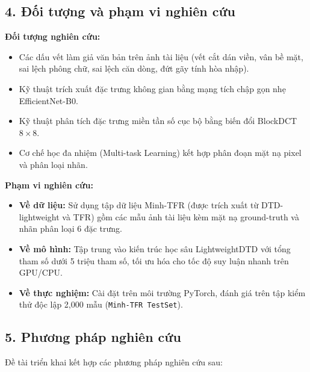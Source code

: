 \subsection{4. Đối tượng và phạm vi nghiên cứu}

\indent\indent \textbf{Đối tượng nghiên cứu:}
\begin{itemize}
    \item Các dấu vết làm giả văn bản trên ảnh tài liệu (vết cắt dán viền, vân bề mặt, sai lệch phông chữ, sai lệch căn dòng, đứt gãy tính hòa nhập).
    \item Kỹ thuật trích xuất đặc trưng không gian bằng mạng tích chập gọn nhẹ EfficientNet-B0.
    \item Kỹ thuật phân tích đặc trưng miền tần số cục bộ bằng biến đổi BlockDCT $8 \times 8$.
    \item Cơ chế học đa nhiệm (Multi-task Learning) kết hợp phân đoạn mặt nạ pixel và phân loại nhãn.
\end{itemize}
\vspace{0.3cm}

\textbf{Phạm vi nghiên cứu:}
\begin{itemize}
    \item \textbf{Về dữ liệu:} Sử dụng tập dữ liệu Minh-TFR (được trích xuất từ DTD-lightweight và TFR) gồm các mẫu ảnh tài liệu kèm mặt nạ ground-truth và nhãn phân loại 6 đặc trưng.
    \item \textbf{Về mô hình:} Tập trung vào kiến trúc học sâu LightweightDTD với tổng tham số dưới 5 triệu tham số, tối ưu hóa cho tốc độ suy luận nhanh trên GPU/CPU.
    \item \textbf{Về thực nghiệm:} Cài đặt trên môi trường PyTorch, đánh giá trên tập kiểm thử độc lập 2,000 mẫu (\texttt{Minh-TFR TestSet}).
\end{itemize}

\subsection{5. Phương pháp nghiên cứu}

\indent\indent Đề tài triển khai kết hợp các phương pháp nghiên cứu sau:\vspace{0.3cm}

